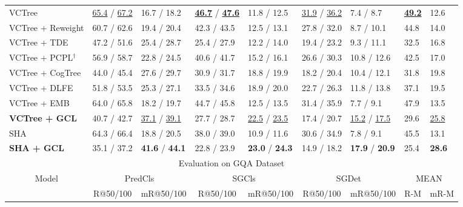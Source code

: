 \documentclass[10pt,twocolumn,letterpaper]{article}
\begin{document}
\begin{table*}[t]
\begin{tabular}{p{3.2cm}|p{1.4cm}<{\centering}p{1.4cm}<{\centering}|p{1.4cm}<{\centering}p{1.4cm}<{\centering}|p{1.4cm}<{\centering}p{1.4cm}<{\centering}|p{0.5cm}<{\centering}p{0.5cm}}
		VCTree \cite{tang2020unbiased} & \underline{65.4} / \underline{67.2} & 16.7 / 18.2 & \underline{\textbf{46.7}} / \underline{\textbf{47.6}} & 11.8 / 12.5 & \underline{31.9} / \underline{36.2} & 7.4 / 8.7 & \underline{\textbf{49.2}} & 12.6 \\
		VCTree + Reweight \cite{chiou2021recovering} & 60.7 / 62.6 & 19.4 / 20.4 & 42.3 / 43.5 & 12.5 / 13.1 & 27.8 / 32.0 & 8.7 / 10.1 & 44.8 & 14.0 \\
		VCTree + TDE \cite{tang2020unbiased} & 47.2 / 51.6 & 25.4 / 28.7 & 25.4 / 27.9 & 12.2 / 14.0 & 19.4 / 23.2 & 9.3 / 11.1 & 32.5 & 16.8 \\
		VCTree + {PCPL}$^{\dag}$ \cite{chiou2021recovering}  & 56.9 / 58.7 & 22.8 / 24.5 & 40.6 / 41.7 & 15.2 / 16.1 & 26.6 / 30.3 & 10.8 / 12.6 & 42.5 & 17.0 \\
		VCTree + CogTree \cite{yu2020cogtree} &  44.0 / 45.4 & 27.6 / 29.7 & 30.9 / 31.7 & 18.8 / 19.9 & 18.2 / 20.4 & 10.4 / 12.1 & 31.8 & 19.8 \\ 
		VCTree + DLFE \cite{chiou2021recovering} & 51.8 / 53.5 & 25.3 / 27.1 & 33.5 / 34.6 & 18.9 / 20.0 & 22.7 / 26.3 & 11.8 / 13.8 & 37.1 & 19.5 \\
		VCTree + EMB \cite{suhail2021energy} & 64.0 / 65.8 & 18.2 / 19.7 & 44.7 / 45.8 & 12.5 / 13.5 & 31.4 / 35.9 & 7.7 / 9.1 & 47.9 & 13.5 \\ 
		\textbf{VCTree + GCL} & 40.7 / 42.7 & \underline{37.1} / \underline{39.1} & 27.7 / 28.7 & \underline{22.5} / \underline{23.5} & 17.4 / 20.7 & \underline{15.2} / \underline{17.5} & 29.6 & \underline{25.8} \\\hline
		
		SHA & 64.3 / 66.4 & 18.8 / 20.5 & 38.0 / 39.0 & 10.9 / 11.6 & 30.6 / 34.9 & 7.8 / 9.1 & 45.5 & 13.1 \\
		\textbf{SHA + GCL} & 35.1 / 37.2  & \textbf{41.6} / \textbf{44.1}  & 22.8 / 23.9 & \textbf{23.0} / \textbf{24.3} & 14.9 / 18.2 & \textbf{17.9} / \textbf{20.9} & 25.4 & \textbf{28.6} \\\hline
		
		
	    
		 
		\multicolumn{9}{c}{\multirow{2}{*}{Evaluation on GQA Dataset}}\\
		\multicolumn{9}{c}{}\\
		 
		\hline
		\multicolumn{1}{c|}{\multirow{2}{*}{Model}} & \multicolumn{2}{c|}{PredCls}& \multicolumn{2}{c|}{SGCls}& \multicolumn{2}{c|}{SGDet}& \multicolumn{2}{c}{MEAN}\\ \cline{2-9} 
		\multicolumn{1}{c|}{}& \multicolumn{1}{c}{R@50/100} & \multicolumn{1}{c|}{mR@50/100} & \multicolumn{1}{c}{R@50/100} & \multicolumn{1}{c|}{mR@50/100} & \multicolumn{1}{c}{R@50/100} & \multicolumn{1}{c|}{mR@50/100} & \multicolumn{1}{c}{R-M} & \multicolumn{1}{c}{mR-M}\\ \hline
		

\end{tabular}
\end{table*}
\end{document}
